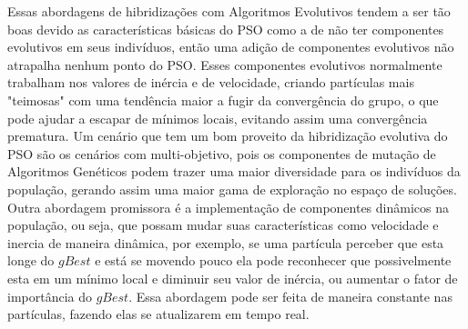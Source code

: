 %
Essas abordagens de hibridizações com Algoritmos Evolutivos tendem a ser tão boas devido as características básicas do PSO como a de não ter componentes evolutivos em seus indivíduos, então uma adição de componentes evolutivos não atrapalha nenhum ponto do PSO.
%
Esses componentes evolutivos normalmente trabalham nos valores de inércia e de velocidade, criando partículas mais "teimosas" com uma tendência maior a fugir da convergência do grupo, o que pode ajudar a escapar de mínimos locais, evitando assim uma convergência prematura.
%
Um cenário que tem um bom proveito da hibridização evolutiva do PSO são os cenários com multi-objetivo, pois os componentes de mutação de Algoritmos Genéticos podem trazer uma maior diversidade para os indivíduos da população, gerando assim uma maior gama de exploração no espaço de soluções.\\
\indent Outra abordagem promissora é a implementação de componentes dinâmicos na população, ou seja, que possam mudar suas características como velocidade e inercia de maneira dinâmica, por exemplo, se uma partícula perceber que esta longe do $gBest$ e está se movendo pouco ela pode reconhecer que possivelmente esta em um mínimo local e diminuir seu valor de inércia, ou aumentar o fator de importância do $gBest$.
%
Essa abordagem pode ser feita de maneira constante nas partículas, fazendo elas se atualizarem em tempo real.
%

%
